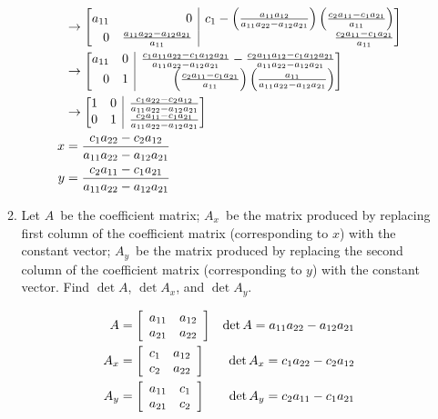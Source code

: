 \documentclass{letter}
\makeatletter
\newcommand{\?}{\stackrel{?}{=}}
\newcommand\Que[1]{%
   \leavevmode\noindent
   #1
}
\newcommand\Ans[2][]{%
   \leavevmode\noindent
   {
       \begin{mdframed}[backgroundcolor=blue!10]
       #2
       \end{mdframed}
   }
}
\newenvironment{Mat}[1]{%
  \left[\begin{array}{*{#1}{r}}
}{%
  \end{array}\right]
}
\newenvironment{Amat}[1]{%
  \left[\begin{array}{@{}*{#1}{r}|r@{}}
}{%
  \end{array}\right]
}
\makeatother
\begin{document}
\begin{enumerate}
\begin{enumerate}[label=(\alph*)]
{\begin{align*}
           &\to
           \begin{Amat}{2} a_{11} & 0 & c_1-\left(\frac{a_{11}a_{12}}{a_{11}a_{22}-a_{12}a_{21}}\right)\left(\frac{c_2a_{11}-c_1a_{21}}{a_{11}}\right) \\
                                0 & \frac{a_{11}a_{22}-a_{12}a_{21}}{a_{11}} &\frac{c_2a_{11}-c_1a_{21}}{a_{11}} \end{Amat} \\
           &\to
           \begin{Amat}{2} a_{11} & 0 & \frac{c_1a_{11}a_{22}-c_1a_{12}a_{21}}{a_{11}a_{22}-a_{12}a_{21}} - \frac{c_2a_{11}a_{12}-c_1a_{12}a_{21}}{a_{11}a_{22}-a_{12}a_{21}} \\
                                0 & 1 & \left(\frac{c_2a_{11}-c_1a_{21}}{a_{11}}\right)\left(\frac{a_{11}}{a_{11}a_{22}-a_{12}a_{21}}\right) \end{Amat} \\
           &\to
           \begin{Amat}{2} 1 & 0 & \frac{c_1a_{22}-c_2a_{12}}{a_{11}a_{22}-a_{12}a_{21}} \\
                           0 & 1 & \frac{c_2a_{11}-c_1a_{21}}{a_{11}a_{22}-a_{12}a_{21}} \end{Amat} \\
           x &= \frac{c_1a_{22}-c_2a_{12}}{a_{11}a_{22}-a_{12}a_{21}} \\
           y &= \frac{c_2a_{11}-c_1a_{21}}{a_{11}a_{22}-a_{12}a_{21}}
       \end{align*}
    }
    \newpage
    \item \Que{
        Let $A$\ be the coefficient matrix; $A_x$\ be the matrix produced by replacing first column of the coefficient matrix (corresponding to $x$) with the constant vector; $A_y$\ be the matrix produced by replacing the second column of the coefficient matrix (corresponding to $y$) with the constant vector.  Find $\det A$, $\det A_x$, and $\det A_y$.
    }
    \Ans{
    \begin{align*}
        A &= \begin{Mat}{2}  a_{11} & a_{12} \\ a_{21} & a_{22} \end{Mat} &\det A   = a_{11}a_{22} - a_{12}a_{21} \\
        A_x &= \begin{Mat}{2}   c_1 & a_{12} \\    c_2 & a_{22} \end{Mat} &\det A_x = c_1a_{22} - c_2a_{12} \\
        A_y &= \begin{Mat}{2}a_{11} &    c_1 \\ a_{21} &   c_2  \end{Mat} &\det A_y = c_2a_{11} - c_1a_{21}  
    \end{align*}
        
}
\end{enumerate}
\end{enumerate}
\end{document}
